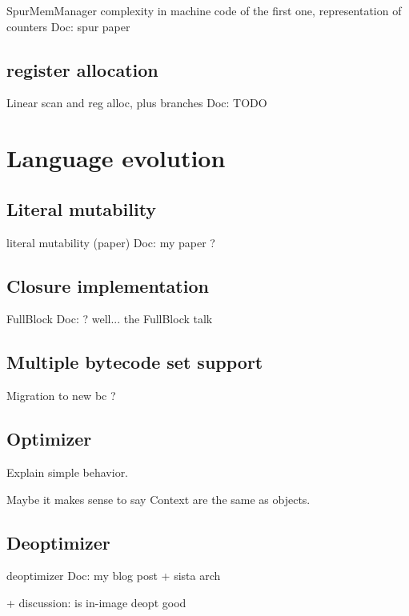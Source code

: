 \documentclass[a4paper,12pt,twoside]{../includes/ThesisStyle}
\begin{document}
SpurMemManager complexity in machine code of the first one, representation of counters
Doc: spur paper

\subsection{register allocation}
Linear scan and reg alloc, plus branches
Doc: TODO

\section{Language evolution}

\subsection{Literal mutability}

literal mutability (paper)
Doc: my paper ?

\subsection{Closure implementation}
FullBlock
Doc: ? well... the FullBlock talk

\subsection{Multiple bytecode set support}
Migration to new bc ?

\subsection{Optimizer}

Explain simple behavior.

Maybe it makes sense to say Context are the same as objects.

\subsection{Deoptimizer}
deoptimizer 
Doc: my blog post + sista arch

+ discussion: is in-image deopt good



\ifx\wholebook\relax\else
    
\end{document}
